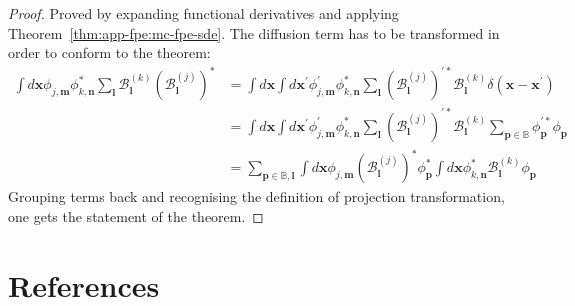 \documentclass[12pt,aip,jmp,amssymb,amsmath]{revtex4-1}
\begin{document}
\begin{proof}
Proved by expanding functional derivatives and applying Theorem~\ref{thm:app-fpe:mc-fpe-sde}.
The diffusion term has to be transformed in order to conform to the theorem:
\begin{eqnarray}
    \int d\boldsymbol{x} \phi_{j,\boldsymbol{m}} \phi_{k,\boldsymbol{n}}^* \sum_{\boldsymbol{l}} \mathcal{B}_{\boldsymbol{l}}^{(k)} (\mathcal{B}_{\boldsymbol{l}}^{(j)})^*
    & = \int d\boldsymbol{x} \int d\boldsymbol{x}^\prime
            \phi_{j,\boldsymbol{m}}^\prime \phi_{k,\boldsymbol{n}}^*
            \sum_{\boldsymbol{l}} (\mathcal{B}_{\boldsymbol{l}}^{(j)})^{\prime *} \mathcal{B}_{\boldsymbol{l}}^{(k)}
            \delta(\boldsymbol{x} - \boldsymbol{x}^\prime) \\
    & = \int d\boldsymbol{x} \int d\boldsymbol{x}^\prime
            \phi_{j,\boldsymbol{m}}^\prime \phi_{k,\boldsymbol{n}}^*
            \sum_{\boldsymbol{l}} (\mathcal{B}_{\boldsymbol{l}}^{(j)})^{\prime *} \mathcal{B}_{\boldsymbol{l}}^{(k)}
            \sum_{\boldsymbol{p} \in \mathbb{B}} \phi_{\boldsymbol{p}}^{\prime*} \phi_{\boldsymbol{p}} \\
    & = \sum_{\boldsymbol{p} \in \mathbb{B}, \boldsymbol{l}}
        \int d\boldsymbol{x}
            \phi_{j,\boldsymbol{m}} (\mathcal{B}_{\boldsymbol{l}}^{(j)})^* \phi_{\boldsymbol{p}}^*
        \int d\boldsymbol{x}
            \phi_{k,\boldsymbol{n}}^* \mathcal{B}_{\boldsymbol{l}}^{(k)} \phi_{\boldsymbol{p}}
\end{eqnarray}
Grouping terms back and recognising the definition of projection transformation, one gets the statement of the theorem.
\end{proof}



\section*{References}
%

\end{document}
